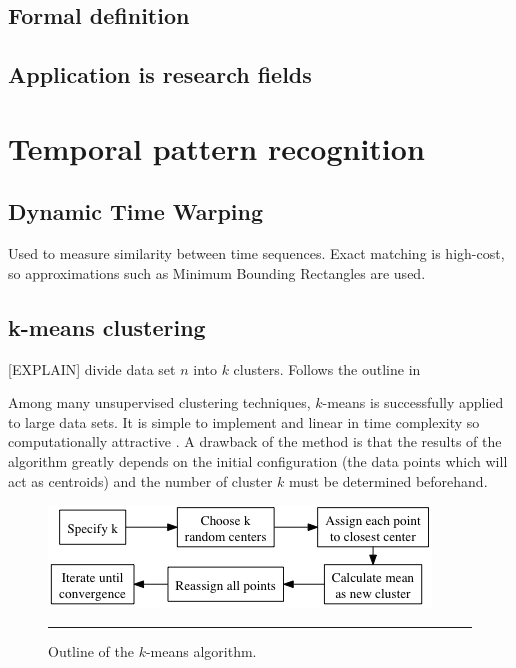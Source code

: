 
\subsection{Formal definition}






\subsection{Application is research fields}



\section{Temporal pattern recognition}

\subsection{Dynamic Time Warping}
Used to measure similarity between time sequences.
Exact matching is high-cost, so approximations such as Minimum Bounding Rectangles are used.

\subsection{k-means clustering}
[EXPLAIN] divide data set $n$ into $k$ clusters. Follows the outline in 

Among many unsupervised clustering techniques, $k$-means is successfully applied to large data sets.
It is simple to implement and linear in time complexity so computationally attractive \cite{jain1999data}.
A drawback of the method is that the results of the algorithm greatly depends on the initial configuration (the data points which will act as centroids) and the number of cluster $k$ must be determined beforehand.

\begin{figure}[htbp]
	\centering
		\includegraphics{./Figures/k_means.png}
		\rule{35em}{0.5pt}
	\caption[K-means]{Outline of the $k$-means algorithm.}
	\label{fig:k_means}
\end{figure}

